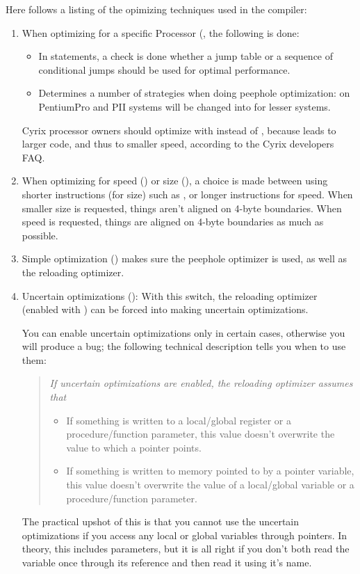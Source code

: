 \documentclass{report}
\begin{document}
Here follows a listing of the opimizing techniques used in the compiler:
\begin{enumerate}
\item When optimizing for a specific Processor (,
the following is done:
\begin{itemize}
\item In  statements, a check is done whether a jump table
or a sequence of conditional jumps should be used for optimal performance.
\item Determines a number of strategies when doing peephole optimization:
 on PentiumPro and PII systems will be changed
into  for lesser systems.
\end{itemize}
Cyrix  processor owners should optimize with  instead of
, because  leads to larger code, and thus to smaller
speed, according to the Cyrix developers FAQ.
  \item When optimizing for speed () or size (), a choice is
made between using shorter instructions (for size) such as ,
or longer instructions  for speed. When smaller size is
requested, things aren't aligned on 4-byte boundaries.  When speed is
requested, things are aligned on 4-byte boundaries as much as possible.
\item Simple optimization () makes sure the peephole optimizer is
used, as well as the reloading optimizer.
\item Uncertain optimizations (): With this switch, the reloading
optimizer (enabled with ) can be forced into making uncertain
optimizations.

You can enable uncertain optimizations only in certain cases,
otherwise you will produce a bug; the following technical description
tells you when to use them:
\begin{quote}
\em
If uncertain optimizations are enabled, the reloading optimizer assumes
that
\begin{itemize}
\item If something is written to a local/global register or a
procedure/function parameter, this value doesn't overwrite the value to
which a pointer points.
\item If something is written to memory pointed to by a pointer variable,
this value doesn't overwrite the value of a local/global variable or a
procedure/function parameter.
\end{itemize}
\end{quote}
The practical upshot of this is that you cannot use the uncertain
optimizations if you access any local or global variables through pointers. In
theory, this includes  parameters, but it is all right
if you don't both read the variable once through its  reference
and then read it using it's name.


\end{enumerate}
\end{document}

